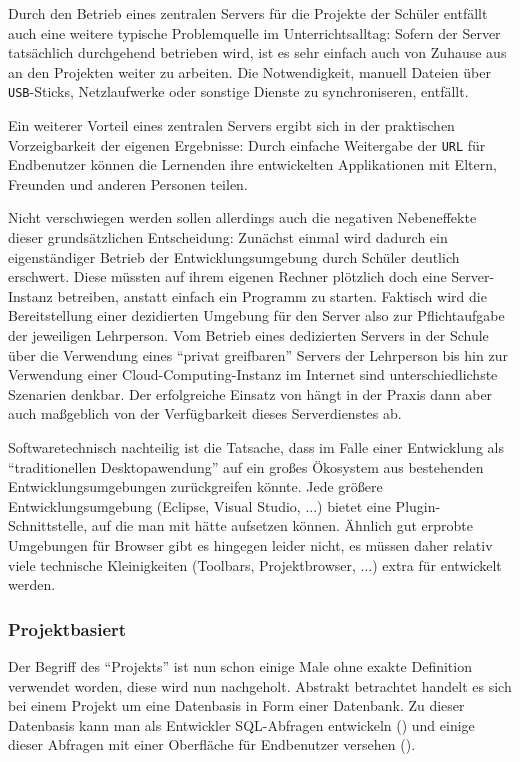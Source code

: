 Durch den Betrieb eines zentralen Servers für die Projekte der Schüler entfällt auch eine weitere typische Problemquelle im Unterrichtsalltag: Sofern der Server tatsächlich durchgehend betrieben wird, ist es sehr einfach auch von Zuhause aus an den Projekten weiter zu arbeiten. Die Notwendigkeit, manuell Dateien über \texttt{USB}-Sticks, Netzlaufwerke oder sonstige Dienste zu synchroniseren, entfällt.

Ein weiterer Vorteil eines zentralen Servers ergibt sich in der praktischen Vorzeigbarkeit der eigenen Ergebnisse: Durch einfache Weitergabe der \texttt{URL} für Endbenutzer können die Lernenden ihre entwickelten Applikationen mit Eltern, Freunden und anderen Personen teilen.

Nicht verschwiegen werden sollen allerdings auch die negativen Nebeneffekte dieser grundsätzlichen Entscheidung: Zunächst einmal wird dadurch ein eigenständiger Betrieb der Entwicklungsumgebung durch Schüler deutlich erschwert. Diese müssten auf ihrem eigenen Rechner plötzlich doch eine Server-Instanz betreiben, anstatt einfach ein Programm zu starten. Faktisch wird die Bereitstellung einer dezidierten Umgebung für den Server also zur Pflichtaufgabe der jeweiligen Lehrperson. Vom Betrieb eines dedizierten Servers in der Schule über die Verwendung eines "`privat greifbaren"' Servers der Lehrperson bis hin zur Verwendung einer Cloud-Computing-Instanz im Internet sind unterschiedlichste Szenarien denkbar. Der erfolgreiche Einsatz von \idename{} hängt in der Praxis dann aber auch maßgeblich von der Verfügbarkeit dieses Serverdienstes ab.

Softwaretechnisch nachteilig ist die Tatsache, dass \idename{} im Falle einer Entwicklung als "`traditionellen Desktopawendung"' auf ein großes Ökosystem aus bestehenden Entwicklungsumgebungen zurückgreifen könnte. Jede größere Entwicklungsumgebung (Eclipse, Visual Studio, ...) bietet eine Plugin-Schnittstelle, auf die man mit \idename{} hätte aufsetzen können. Ähnlich gut erprobte Umgebungen für Browser gibt es hingegen leider nicht, es müssen daher relativ viele technische Kleinigkeiten (Toolbars, Projektbrowser, ...) extra für \idename{} entwickelt werden.

\subsubsection{Projektbasiert}

Der Begriff des "`Projekts"' ist nun schon einige Male ohne exakte Definition verwendet worden, diese wird nun nachgeholt. Abstrakt betrachtet handelt es sich bei einem Projekt um eine Datenbasis in Form einer Datenbank. Zu dieser Datenbasis kann man als Entwickler SQL-Abfragen entwickeln () und einige dieser Abfragen mit einer Oberfläche für Endbenutzer versehen ().

